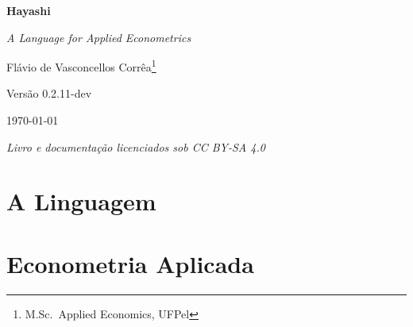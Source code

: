 \documentclass[12pt, a4paper, twoside, openright]{book}
\newcommand{\version}{0.2.11-dev}
\begin{document}
\begin{titlepage}
  \centering
  \vspace*{3cm}
  {\Huge\bfseries\color{hayblue} Hayashi \par}
  \vspace{0.5cm}
  {\large\itshape A Language for Applied Econometrics \par}
  \vspace{2cm}
  \renewcommand{\thefootnote}{\fnsymbol{footnote}}%
  {\large Flávio de Vasconcellos Corrêa\footnote{M.Sc.~Applied Economics, UFPel} \par}%
  \renewcommand{\thefootnote}{\arabic{footnote}}
  \vspace{1cm}
  {\normalsize Versão \version{} \par}
  \vfill
  {\small \today \par}
  \vspace{0.5cm}
  {\small\itshape Livro e documentação licenciados sob CC BY-SA 4.0 \par}
\end{titlepage}

\cleardoublepage

\frontmatter


\tableofcontents
\cleardoublepage

\mainmatter

\part{A Linguagem}




















\part{Econometria Aplicada}
\end{document}
